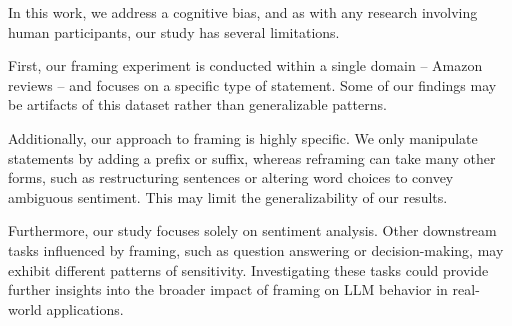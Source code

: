 In this work, we address a cognitive bias, and as with any research involving human participants, our study has several limitations.

First, our framing experiment is conducted within a single domain -- Amazon reviews -- and focuses on a specific type of statement. Some of our findings may be artifacts of this dataset rather than generalizable patterns.

Additionally, our approach to framing is highly specific. We only manipulate statements by adding a prefix or suffix, whereas reframing can take many other forms, such as restructuring sentences or altering word choices to convey ambiguous sentiment. This may limit the generalizability of our results.

Furthermore, our study focuses solely on sentiment analysis. Other downstream tasks influenced by framing, such as question answering or decision-making, may exhibit different patterns of sensitivity. Investigating these tasks could provide further insights into the broader impact of framing on LLM behavior in real-world applications.


